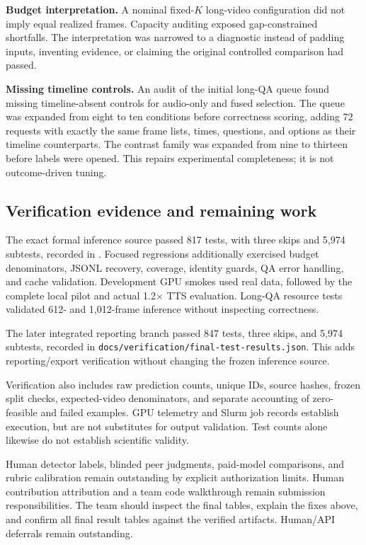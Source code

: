 \documentclass[10pt,twocolumn]{article}
\begin{document}
\textbf{Budget interpretation.} A nominal fixed-$K$ long-video configuration did not imply equal realized frames. Capacity auditing exposed gap-constrained shortfalls. The interpretation was narrowed to a diagnostic instead of padding inputs, inventing evidence, or claiming the original controlled comparison had passed.

\textbf{Missing timeline controls.} An audit of the initial long-QA queue found missing timeline-absent controls for audio-only and fused selection. The queue was expanded from eight to ten conditions before correctness scoring, adding 72 requests with exactly the same frame lists, times, questions, and options as their timeline counterparts. The contrast family was expanded from nine to thirteen before labels were opened. This repairs experimental completeness; it is not outcome-driven tuning.

\subsection{Verification evidence and remaining work}
The exact formal inference source passed 817 tests, with three skips and 5,974 subtests, recorded in . Focused regressions additionally exercised budget denominators, JSONL recovery, coverage, identity guards, QA error handling, and cache validation. Development GPU smokes used real data, followed by the complete local pilot and actual 1.2$\times$ TTS evaluation. Long-QA resource tests validated 612- and 1,012-frame inference without inspecting correctness.

The later integrated reporting branch passed 847 tests, three skips, and 5,974 subtests, recorded in \texttt{docs/verification/final-test-results.json}. This adds reporting/export verification without changing the frozen inference source.

Verification also includes raw prediction counts, unique IDs, source hashes, frozen split checks, expected-video denominators, and separate accounting of zero-feasible and failed examples. GPU telemetry and Slurm job records establish execution, but are not substitutes for output validation. Test counts alone likewise do not establish scientific validity.

Human detector labels, blinded peer judgments, paid-model comparisons, and rubric calibration remain outstanding by explicit authorization limits. Human contribution attribution and a team code walkthrough remain submission responsibilities. The team should inspect the final tables, explain the fixes above, and confirm all final result tables against the verified artifacts. Human/API deferrals remain outstanding.
\end{document}
